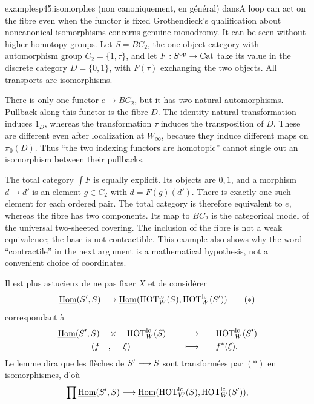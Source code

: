\begin{dcomment}{examples}{p45:isomorphes (non canoniquement, en général) dans}{A loop can act on the fibre even when the functor is fixed}
Grothendieck's qualification about noncanonical isomorphisms concerns genuine monodromy. It can be seen without higher homotopy groups. Let $S=BC_2$, the one-object category with automorphism group $C_2=\{1,\tau\}$, and let $F:S^{\mathrm{op}}\to\mathrm{Cat}$ take its value in the discrete category $D=\{0,1\}$, with $F(\tau)$ exchanging the two objects. All transports are isomorphisms.

There is only one functor $e\to BC_2$, but it has two natural automorphisms. Pullback along this functor is the fibre $D$. The identity natural transformation induces $1_D$, whereas the transformation $\tau$ induces the transposition of $D$. These are different even after localization at $W_\infty$, because they induce different maps on $\pi_0(D)$. Thus ``the two indexing functors are homotopic'' cannot single out an isomorphism between their pullbacks.

The total category $\int F$ is equally explicit. Its objects are $0,1$, and a morphism $d\to d'$ is an element $g\in C_2$ with $d=F(g)(d')$. There is exactly one such element for each ordered pair. The total category is therefore equivalent to $e$, whereas the fibre has two components. Its map to $BC_2$ is the categorical model of the universal two-sheeted covering. The inclusion of the fibre is not a weak equivalence; the base is not contractible. This example also shows why the word ``contractile'' in the next argument is a mathematical hypothesis, not a convenient choice of coordinates.
\end{dcomment}


Il est plus astucieux de ne pas fixer $X$ et de considérer
\[ \underline{\mathrm{Hom}}(S',S)\longrightarrow\underline{\mathrm{Hom}}(\mathrm{HOT}^{\mathrm{lc}}_W(S),\mathrm{HOT}^{\mathrm{lc}}_W(S')) \tag*{$(*)$} \]
correspondant à
\[
\begin{aligned}
\underline{\mathrm{Hom}}(S',S) &\quad\times\quad \mathrm{HOT}^{\mathrm{lc}}_W(S) &&\quad\longrightarrow\quad &&\mathrm{HOT}^{\mathrm{lc}}_W(S')\\
(f &\quad,\quad\ \xi) &&\quad\longmapsto\quad && f^*(\xi).
\end{aligned}
\]
Le lemme dira que les flèches de $S'\longrightarrow S$ sont transformées par $(*)$ en isomorphismes, d'où
\[ \prod\underline{\mathrm{Hom}}(S',S)\longrightarrow\underline{\mathrm{Hom}}(\mathrm{HOT}^{\mathrm{lc}}_W(S),\mathrm{HOT}^{\mathrm{lc}}_W(S')), \]



